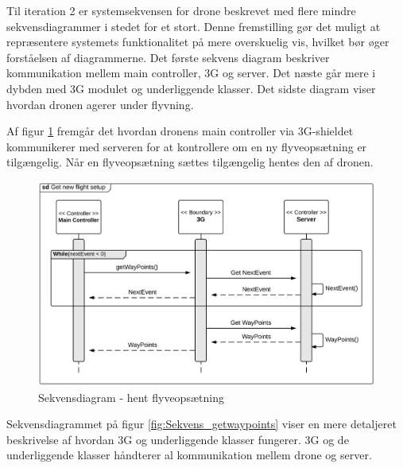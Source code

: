 Til iteration 2 er systemsekvensen for drone beskrevet med flere mindre sekvensdiagrammer i stedet for et stort. Denne fremstilling gør det muligt at repræsentere systemets funktionalitet på mere overskuelig vis, hvilket bør øger forståelsen af diagrammerne. Det første sekvens diagram beskriver kommunikation mellem main controller, 3G og server. Det næste går mere i dybden med 3G modulet og underliggende klasser. Det sidste diagram viser hvordan dronen agerer under flyvning.


Af figur \ref{fig:Sekvens_diagram_iteration2_2} fremgår det hvordan dronens main controller via 3G-shieldet kommunikerer med serveren for at kontrollere om en ny flyveopsætning er tilgængelig. Når en flyveopsætning sættes tilgængelig hentes den af dronen. 

\begin{figure}[H]
	\centering
	\includegraphics[width=1\textwidth]{Billeder/sekvens/sekvens_iteration2_2}
	\caption{Sekvensdiagram - hent flyveopsætning}
	\label{fig:Sekvens_diagram_iteration2_2}
\end{figure}

\newpage

Sekvensdiagrammet på figur \ref{fig:Sekvens_getwaypoints} viser en mere detaljeret beskrivelse af hvordan 3G og underliggende klasser fungerer. 3G og de underliggende klasser håndterer al kommunikation mellem drone og server.

